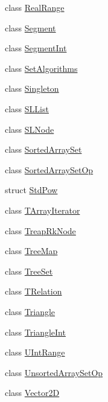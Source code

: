 \begin{DoxyCompactItemize}
class \hyperlink{class_designar_1_1_real_range}{Real\+Range}
\item 
class \hyperlink{class_designar_1_1_segment}{Segment}
\item 
class \hyperlink{class_designar_1_1_segment_int}{Segment\+Int}
\item 
class \hyperlink{class_designar_1_1_set_algorithms}{Set\+Algorithms}
\item 
class \hyperlink{class_designar_1_1_singleton}{Singleton}
\item 
class \hyperlink{class_designar_1_1_s_l_list}{S\+L\+List}
\item 
class \hyperlink{class_designar_1_1_s_l_node}{S\+L\+Node}
\item 
class \hyperlink{class_designar_1_1_sorted_array_set}{Sorted\+Array\+Set}
\item 
class \hyperlink{class_designar_1_1_sorted_array_set_op}{Sorted\+Array\+Set\+Op}
\item 
struct \hyperlink{struct_designar_1_1_std_pow}{Std\+Pow}
\item 
class \hyperlink{class_designar_1_1_t_array_iterator}{T\+Array\+Iterator}
\item 
class \hyperlink{class_designar_1_1_treap_rk_node}{Treap\+Rk\+Node}
\item 
class \hyperlink{class_designar_1_1_tree_map}{Tree\+Map}
\item 
class \hyperlink{class_designar_1_1_tree_set}{Tree\+Set}
\item 
class \hyperlink{class_designar_1_1_t_relation}{T\+Relation}
\item 
class \hyperlink{class_designar_1_1_triangle}{Triangle}
\item 
class \hyperlink{class_designar_1_1_triangle_int}{Triangle\+Int}
\item 
class \hyperlink{class_designar_1_1_u_int_range}{U\+Int\+Range}
\item 
class \hyperlink{class_designar_1_1_unsorted_array_set_op}{Unsorted\+Array\+Set\+Op}
\item 
class \hyperlink{class_designar_1_1_vector2_d}{Vector2D}
\end{DoxyCompactItemize}
